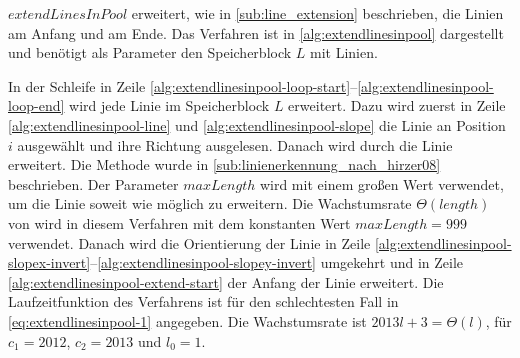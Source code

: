 $\mathit{extendLinesInPool}$ erweitert, wie in \autoref{sub:line_extension} beschrieben, die Linien am Anfang und am
 Ende. Das Verfahren ist in \autoref{alg:extendlinesinpool} dargestellt und benötigt als Parameter den Speicherblock
 $L$ mit Linien.

In der Schleife in Zeile \ref{alg:extendlinesinpool-loop-start}--\ref{alg:extendlinesinpool-loop-end} wird jede Linie im
 Speicherblock $L$ erweitert. Dazu wird zuerst in Zeile \ref{alg:extendlinesinpool-line} und
 \ref{alg:extendlinesinpool-slope} die Linie an Position $i$ ausgewählt und ihre Richtung ausgelesen. Danach wird durch
  die Linie erweitert. Die Methode  wurde in
 \autoref{sub:linienerkennung_nach_hirzer08} beschrieben. Der Parameter $\mathit{maxLength}$ wird mit einem großen Wert
 verwendet, um die Linie soweit wie möglich zu erweitern. Die Wachstumsrate $\Theta(\mathit{length})$ von
  wird in diesem Verfahren mit dem konstanten Wert $\mathit{maxLength} = 999$ verwendet. Danach
 wird die Orientierung der Linie in Zeile
 \ref{alg:extendlinesinpool-slopex-invert}--\ref{alg:extendlinesinpool-slopey-invert} umgekehrt und in Zeile
 \ref{alg:extendlinesinpool-extend-start} der Anfang der Linie erweitert. Die Laufzeitfunktion des Verfahrens ist für
 den schlechtesten Fall in \autoref{eq:extendlinesinpool-1} angegeben. Die Wachstumsrate ist $2013l + 3 = \Theta(l)$,
 für $c_{1} = 2012$, $c_{2} = 2013$ und $l_{0} = 1$.


